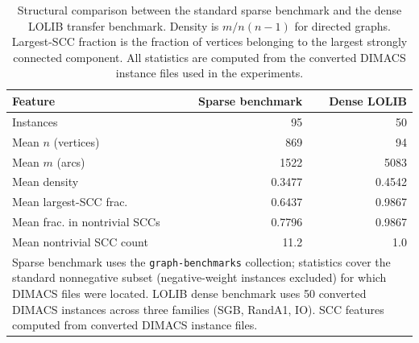 \begin{table}[htbp]
\centering
\footnotesize
\caption{Structural comparison between the standard sparse benchmark and the
dense LOLIB transfer benchmark. Density is $m / n(n{-}1)$ for directed graphs.
Largest-SCC fraction is the fraction of vertices belonging to the largest
strongly connected component. All statistics are computed from the
converted DIMACS instance files used in the experiments.}
\label{tab:structural_diagnostic}
\begin{tabular}{lrr}
\toprule
Feature & Sparse benchmark & Dense LOLIB \\
\midrule
Instances & 95 & 50 \\
Mean $n$ (vertices) & 869 & 94 \\
Mean $m$ (arcs) & 1522 & 5083 \\
Mean density & 0.3477 & 0.4542 \\
Mean largest-SCC frac. & 0.6437 & 0.9867 \\
Mean frac. in nontrivial SCCs & 0.7796 & 0.9867 \\
Mean nontrivial SCC count & 11.2 & 1.0 \\
\bottomrule
\multicolumn{3}{p{0.9\linewidth}}{\footnotesize
Sparse benchmark uses the \texttt{graph-benchmarks} collection; statistics cover the
standard nonnegative subset (negative-weight instances excluded) for which DIMACS files
were located.
LOLIB dense benchmark uses 50 converted DIMACS instances across three families (SGB, RandA1, IO).
SCC features computed from converted DIMACS instance files.} \\
\end{tabular}
\end{table}
